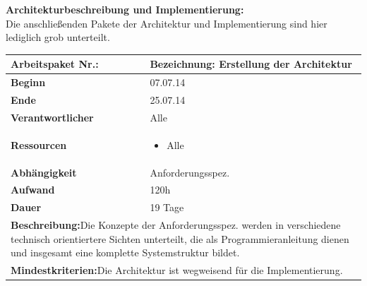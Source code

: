 \documentclass[fontsize=12pt,paper=a4,twoside]{scrartcl}
\begin{document}
	\begin{verbatim} 
	\end{verbatim}
	
	\textbf{Architekturbeschreibung und Implementierung:}\\
	Die anschließenden Pakete der Architektur und Implementierung sind hier lediglich grob unterteilt.
	
	\begin{tabular}{|p{5.3cm}|p{9.7cm}|}\hline
		\textbf{Arbeitspaket Nr.:}  & \textbf{Bezeichnung:} Erstellung der Architektur\\ \hline \hline
		\textbf{Beginn} & 07.07.14\\ \hline
		\textbf{Ende} & 25.07.14\\ \hline
		\textbf{Verantwortlicher} & Alle\\ \hline
		\textbf{Ressourcen} & \begin{itemize}
			\item Alle
		\end{itemize}    \\ \hline
		\textbf{Abhängigkeit} & Anforderungsspez.\\ \hline
		\textbf{Aufwand} & 120h\\ \hline
		\textbf{Dauer} & 19 Tage\\ \hline
		\multicolumn{2}{|p{15cm}|}{\textbf{Beschreibung:}\newline Die Konzepte der Anforderungsspez. werden in verschiedene technisch orientiertere Sichten unterteilt, die als Programmieranleitung dienen und insgesamt eine komplette Systemstruktur bildet.}\\ \hline
		\multicolumn{2}{|p{15cm}|}{\textbf{Mindestkriterien:}\newline Die Architektur ist wegweisend für die Implementierung. }\\ \hline
	\end{tabular}
	
	\begin{verbatim} 
	\end{verbatim}
	
\end{document}
